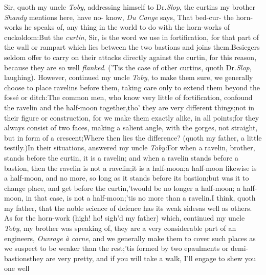 \documentclass{article}
\begin{document}
Sir, quoth my uncle \textit{Toby}, addressing himself to Dr.\@ \textit{Slop},\tsk 
the curtins my brother \textit{Shandy} mentions
here, have no-\break
{} know,
\textit{Du Cange} says, \lqq That bed-cur-
the horn-works he speaks of, any thing in the world to do with the
horn-works of cuckoldom:\tsk But the \textit{curtin}, Sir, is the
word we use in fortification, for that part of the wall or rampart
which lies between the two bastions and joins them.\tsh Be\-siegers
seldom offer to carry on their attacks directly against the curtin,
for this reason, because they are so well
\textit{flanked}.\break
(’Tis the case of other curtins, quoth Dr.\@ \textit{Slop}, laughing). 
However, continued my uncle \textit{Toby}, to
make them sure, we generally choose to place ravelins before them,
taking care only to extend them beyond the fossé or
ditch:\tsh The common men, who know very little of
fortification, confound the ravelin and the half-moon
together,\tsk tho’ they are very different
things;\tsk not in their figure or
construction, for we make them exactly alike, in all
points;\tsk for they always consist of two faces,
making a salient angle, with the gorges, not straight, but in form
of a crescent;\tsk Where then lies the difference? (quoth
my father, a little testily.)\tsk In their situations, answered
my uncle \textit{Toby:}\tsk For when a ravelin, brother, stands
before the curtin, it is a ravelin; and when a ravelin
stands before a bastion, then the ravelin is not a
ravelin;\tsk it is a half-moon;\tsk a half-moon likewise is a
half-moon, and no more, so long as it stands before its
bastion;\tsh but was it to change place, and get before
the curtin,\tsk ’twould be no longer a half-moon; a
half-moon, in that case, is not a half-moon;\tsk ’tis no
more than a ravelin.\tsh I think, quoth my father, that
the noble science of defence has its weak sides\tsh as
well as others.\\
\newpage
\tsh As for the horn-work (high! ho! sigh’d my father)
which, continued my uncle \textit{Toby}, my brother was speaking of,
they are a very considerable part of an 
engineers, \textit{Ouvrage à
corne}, and we generally make them to cover such places as we
suspect to be weaker than the rest;\tsk\break ’tis formed by two
epaulments or demi-bastions\tsk they are very pretty, and
if you will take a walk, I’ll engage to shew you one well
\end{document}
